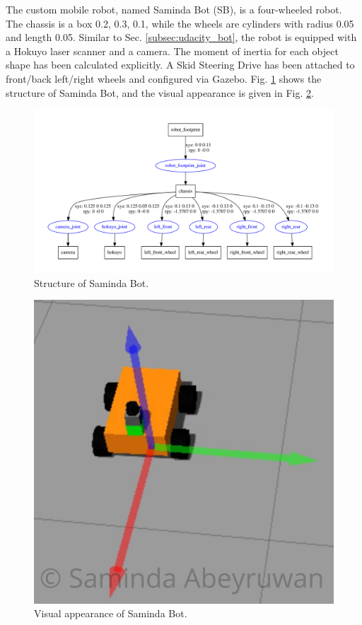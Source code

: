 \documentclass[10pt,journal,compsoc]{IEEEtran}
\begin{document}
The custom mobile robot, named Saminda Bot (SB), is a four-wheeled robot. The chassis is a box 0.2, 0.3, 0.1, while the wheels are cylinders with radius 0.05 and length 0.05. Similar to Sec. \ref{subsec:udacity_bot}, the robot is equipped with a Hokuyo laser scanner and a camera. The moment of inertia for each object shape has been calculated explicitly. A Skid Steering Drive has been attached to front/back left/right wheels and configured via Gazebo. Fig. \ref{fig:saminda_bot} shows the structure of Saminda Bot, and the visual appearance is given in Fig.  \ref{fig:sb}.

\begin{figure}[thpb]
      \centering
      \includegraphics[width=\linewidth]{misc/saminda_bot.pdf}
      \caption{Structure of Saminda Bot.}
      \label{fig:saminda_bot}
\end{figure}

\begin{figure}[thpb]
      \centering
      \includegraphics[width=\linewidth]{misc/sb_w.jpeg}
      \caption{Visual appearance of Saminda Bot.}
      \label{fig:sb}
\end{figure}
\end{document}
